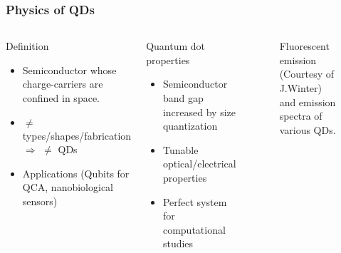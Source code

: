 \documentclass[xcolor=pdftex,hyperref={pdfpagelabels=false},table]{beamer}
\begin{document}
\begin{frame}
\frametitle{Physics of QDs}
\begin{columns}[T,c]
\column{5cm}
\scriptsize
\begin{block}{Definition}
\begin{itemize}
\item Semiconductor whose charge-carriers are confined in space.
\item $\neq$ types/shapes/fabrication \newline $\Rightarrow$ $\neq$ QDs
\item Applications (Qubits for QCA, nanobiological sensors)
\end{itemize}
  \end{block}

\begin{block}{Quantum dot properties}
\begin{itemize}
\item Semiconductor band gap increased by size quantization
\item Tunable optical/electrical properties
\item Perfect system for computational studies
\end{itemize}
  \end{block}
\column{6cm}
\begin{figure}
	\begin{center}
	\vspace{-5pt}
	\caption{Fluorescent emission (Courtesy of J.Winter\cite{Winter2004}) and emission spectra of various QDs.}%
	\vspace{-5pt}
	\end{center}
\end{figure}
\end{columns}
\end{frame}



\end{document}
